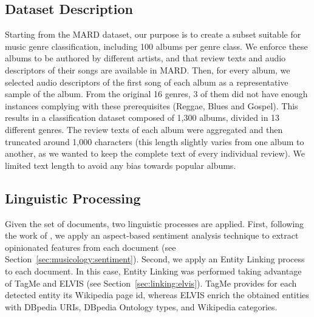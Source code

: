 \subsection{Dataset Description}
\label{sec:similarity:mard}

Starting from the MARD dataset, our purpose is to create a subset suitable for music genre classification, including 100 albums per genre class. We enforce these albums to be authored by different artists, and that review texts and audio descriptors of their songs are available in MARD. Then, for every album, we selected audio descriptors of the first song of each album as a representative sample of the album. From the original 16 genres, 3 of them did not have enough instances complying with these prerequisites (Reggae, Blues and Gospel). This results in a classification dataset composed of 1,300 albums, divided in 13 different genres. The review texts of each album were aggregated and then truncated around 1,000 characters (this length slightly varies from one album to another, as we wanted to keep the complete text of every individual review). We limited text length to avoid any bias towards popular albums.


\subsection{Linguistic Processing}
\label{sec:similarity:processing}

Given the set of documents, two linguistic processes are applied. First, following the work of \cite{DongSOS13,DongOS14}, we apply an aspect-based sentiment analysis technique to extract opinionated features from each document (see Section~\ref{sec:musicology:sentiment}). Second, we apply an Entity Linking process to each document. In this case, Entity Linking was performed taking advantage of TagMe \citep{Ferragina2012} and ELVIS (see Section~\ref{sec:linking:elvis}). TagMe provides for each detected entity its Wikipedia page id, whereas ELVIS enrich the obtained entities with DBpedia URIs, DBpedia Ontology types, and Wikipedia categories.

